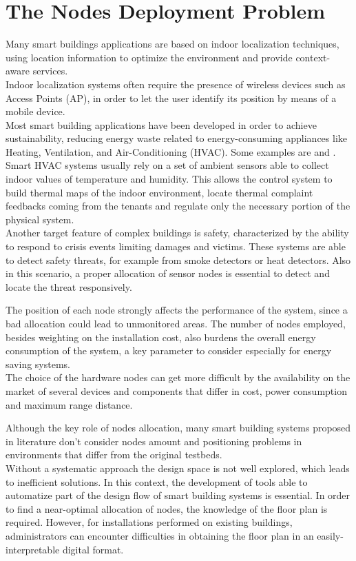\section{The Nodes Deployment Problem}
\label{sec:deploy-problem}

Many smart buildings applications are based on indoor localization techniques, using location information to optimize the environment and provide context-aware services.\\
Indoor localization systems often require the presence of wireless devices such as Access Points (AP), in order to let the user identify its position by means of a mobile device.\\
Most smart building applications have been developed in order to achieve sustainability, reducing energy waste related to energy-consuming appliances like Heating, Ventilation, and Air-Conditioning (HVAC). Some examples are \cite{Erickson2011} and \cite{Balaji2013}. Smart HVAC systems usually rely on a set of ambient sensors able to collect indoor values of temperature and humidity. This allows the control system to build thermal maps of the indoor environment, locate thermal complaint feedbacks coming from the tenants and regulate only the necessary portion of the physical system.\\
Another target feature of complex buildings is safety, characterized by the ability to respond to crisis events limiting damages and victims. These systems are able to detect safety threats, for example from smoke detectors or heat detectors. Also in this scenario, a proper allocation of sensor nodes is essential to detect and locate the threat responsively.

\smallskip
The position of each node strongly affects the performance of the system, since a bad allocation could lead to unmonitored areas.
The number of nodes employed, besides weighting on the installation cost, also burdens the overall energy consumption of the system, a key parameter to consider especially for energy saving systems.\\
The choice of the hardware nodes can get more difficult by the availability on the market of several devices and components that differ in cost, power consumption and maximum range distance.

\smallskip
Although the key role of nodes allocation, many smart building systems proposed in literature don't consider nodes amount and positioning problems in environments that differ from the original testbeds.\\
Without a systematic approach the design space is not well explored, which leads to inefficient solutions.
In this context, the development of tools able to automatize part of the design flow of smart building systems is essential.
In order to find a near-optimal allocation of nodes, the knowledge of the floor plan is required. However, for installations performed on existing buildings, administrators can encounter difficulties in obtaining the floor plan in an easily-interpretable digital format.

